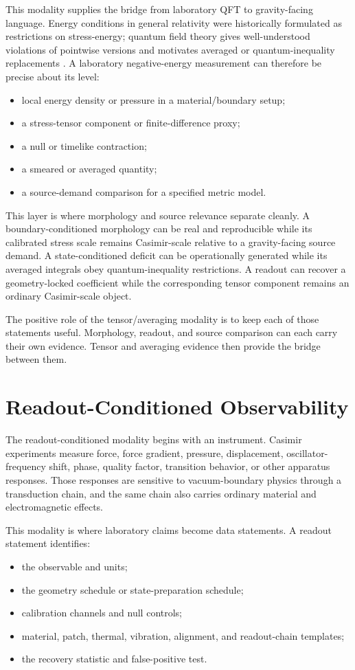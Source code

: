 \documentclass[11pt]{article}
\begin{document}
This modality supplies the bridge from laboratory QFT to gravity-facing
language. Energy conditions in general relativity were historically formulated
as restrictions on stress-energy; quantum field theory gives well-understood
violations of pointwise versions and motivates averaged or quantum-inequality
replacements \cite{KontouSanders2020}. A laboratory negative-energy
measurement can therefore be precise about its level:
\begin{itemize}
\item local energy density or pressure in a material/boundary setup;
\item a stress-tensor component or finite-difference proxy;
\item a null or timelike contraction;
\item a smeared or averaged quantity;
\item a source-demand comparison for a specified metric model.
\end{itemize}

This layer is where morphology and source relevance separate cleanly. A
boundary-conditioned morphology can be real and reproducible while its
calibrated stress scale remains Casimir-scale relative to a gravity-facing
source demand. A state-conditioned deficit can be operationally generated
while its averaged integrals obey quantum-inequality restrictions. A readout
can recover a geometry-locked coefficient while the corresponding tensor
component remains an ordinary Casimir-scale object.

The positive role of the tensor/averaging modality is to keep each of those
statements useful. Morphology, readout, and source comparison can each carry
their own evidence. Tensor and averaging evidence then provide the bridge
between them.

\section{Readout-Conditioned Observability}

The readout-conditioned modality begins with an instrument. Casimir
experiments measure force, force gradient, pressure, displacement,
oscillator-frequency shift, phase, quality factor, transition behavior, or
other apparatus responses. Those responses are sensitive to vacuum-boundary
physics through a transduction chain, and the same chain also carries ordinary
material and electromagnetic effects.

This modality is where laboratory claims become data statements. A readout
statement identifies:
\begin{itemize}
\item the observable and units;
\item the geometry schedule or state-preparation schedule;
\item calibration channels and null controls;
\item material, patch, thermal, vibration, alignment, and readout-chain
templates;
\item the recovery statistic and false-positive test.
\end{itemize}
\end{document}
